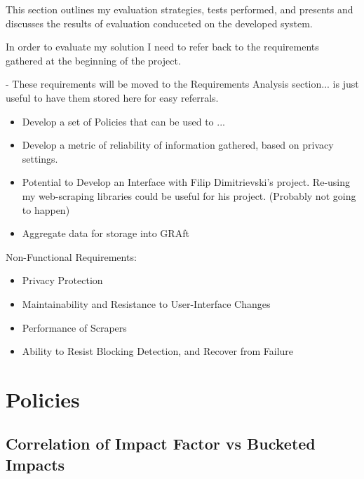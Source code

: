 This section outlines my evaluation strategies, tests performed, and presents and discusses the results of evaluation conduceted on the developed system. 

In order to evaluate my solution I need to refer back to the requirements gathered at the beginning of the project. 

- These requirements will be moved to the Requirements Analysis section... is just useful to have them stored here for easy referrals. 

\begin{itemize}
\item Develop a set of Policies that can be used to ...
\item Develop a metric of reliability of information gathered, based on privacy settings.
\item Potential to Develop an Interface with Filip Dimitrievski's project. Re-using my web-scraping libraries could be useful for his project. (Probably not going to happen)
\item Aggregate data for storage into GRAft
\end{itemize}

Non-Functional Requirements:
\begin{itemize}
\item Privacy Protection
\item Maintainability and Resistance to User-Interface Changes
\item Performance of Scrapers
\item Ability to Resist Blocking Detection, and Recover from Failure
\end{itemize}

\section{Policies}

\subsection{Correlation of Impact Factor vs Bucketed Impacts}

